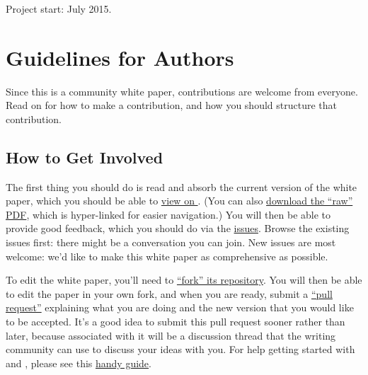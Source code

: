 Project start: July 2015.

\clearpage


\section*{Guidelines for Authors}
\def\secname{guidelines}\label{sec:\secname}


Since this is a community white paper, contributions are welcome from
everyone. Read on for how to make a contribution, and how you should
structure that contribution.

\subsection{How to Get Involved}

The first thing you should do is read and absorb the current version
of the white paper, which you should be able to
\href{http://ls.st/iw2}{view on \GitHub}. (You can also
\href{https://github.com/LSSTScienceCollaborations/ObservingStrategy/raw/master/whitepaper/LSST_Observing_Strategy_White_Paper.pdf}{download
the ``raw'' PDF}, which is hyper-linked for easier navigation.) You
will then be able to provide good feedback, which you should do via
the
\href{https://github.com/LSSTScienceCollaborations/ObservingStrategy/issues}{\GitHub
issues}. Browse the existing issues first: there might be a
conversation you can  join. New issues are most welcome: we'd like to
make this white paper as comprehensive as possible.

To edit the white paper, you'll need to
\href{https://help.github.com/articles/fork-a-repo/}{``fork'' its
repository}. You will then  be able to edit the paper in your own
fork, and when you are ready,  submit a
\href{https://help.github.com/articles/using-pull-requests/}{``pull
request''} explaining what you are doing and the new version that  you
would like to be accepted. It's a good idea to submit this pull
request sooner rather than later, because associated with it will be a
discussion thread that the writing community can use to discuss your
ideas with you. For help getting started with \git and \GitHub, please
see this
\href{https://github.com/drphilmarshall/GettingStarted#top}{handy
guide}.


